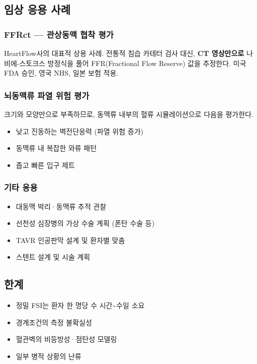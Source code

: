 \documentclass[11pt,a4paper]{article}
\begin{document}
\subsection{임상 응용 사례}

\subsubsection{FFRct --- 관상동맥 협착 평가}

HeartFlow사의 대표적 상용 사례. 전통적 침습 카테터 검사 대신, \textbf{CT 영상만으로} 나비에-스토크스 방정식을 풀어 FFR(Fractional Flow Reserve) 값을 추정한다. 미국 FDA 승인, 영국 NHS, 일본 보험 적용.

\subsubsection{뇌동맥류 파열 위험 평가}

크기와 모양만으로 부족하므로, 동맥류 내부의 혈류 시뮬레이션으로 다음을 평가한다.
\begin{itemize}[leftmargin=*, itemsep=1pt]
  \item 낮고 진동하는 벽전단응력 (파열 위험 증가)
  \item 동맥류 내 복잡한 와류 패턴
  \item 좁고 빠른 입구 제트
\end{itemize}

\subsubsection{기타 응용}

\begin{itemize}[leftmargin=*, itemsep=1pt]
  \item 대동맥 박리·동맥류 추적 관찰
  \item 선천성 심장병의 가상 수술 계획 (폰탄 수술 등)
  \item TAVR 인공판막 설계 및 환자별 맞춤
  \item 스텐트 설계 및 시술 계획
\end{itemize}

\subsection{한계}

\begin{itemize}[leftmargin=*, itemsep=1pt]
  \item 정밀 FSI는 환자 한 명당 수 시간\textasciitilde 수일 소요
  \item 경계조건의 측정 불확실성
  \item 혈관벽의 비등방성·점탄성 모델링
  \item 일부 병적 상황의 난류
\end{itemize}
\end{document}
